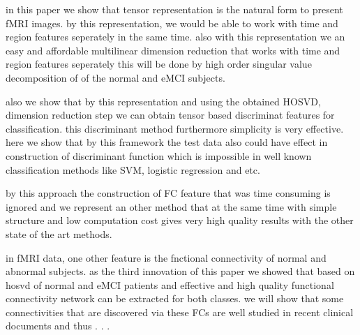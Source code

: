\documentclass[journal]{IEEEtran}
\begin{document}
in this paper we show that tensor representation is the natural form to present fMRI images. by this representation, we would be able to work with time and region features seperately in the same time. also with this representation we an easy and affordable multilinear dimension reduction that works with time and region features seperately this will be done by high order singular value decomposition of of the normal and eMCI subjects.
	
	also we show that by this representation and using the obtained HOSVD, dimension reduction step we can obtain tensor based discriminat features for classification. this discriminant method furthermore simplicity is very effective. here we show that by this framework the test data also could have effect in construction of discriminant function which is impossible in well known classification methods like SVM, logistic regression and etc. 
	
	by this approach the construction of FC feature that was time consuming is ignored and we represent an other method that at the same time with simple structure and low computation cost gives very high quality results with the other state of the art methods. 
	
	in fMRI data, one other feature is the fnctional connectivity of normal and abnormal subjects. as the third innovation of this paper we showed that based on hosvd of normal and eMCI patients and effective and high quality functional connectivity network can be extracted for both classes. we will show that some connectivities that are discovered via these FCs are well studied in recent clinical documents and thus . . . 
	
	
\end{document}
